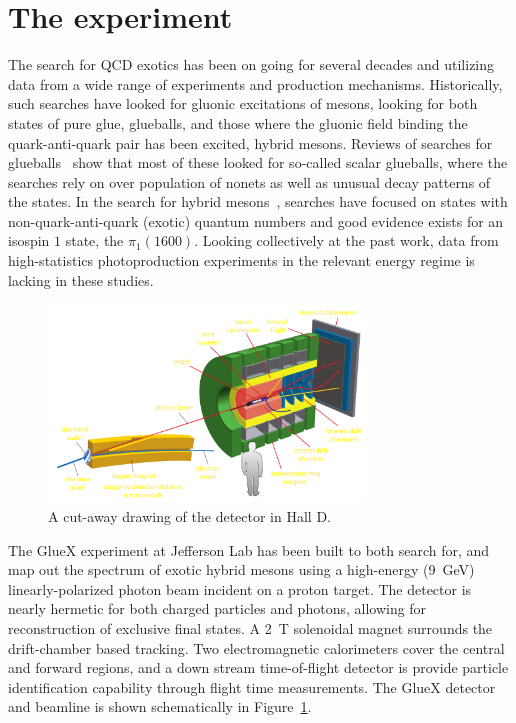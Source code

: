 \section[The \gx{} experiment]{\label{sec:gluexexperiment} The \gx{} experiment}
The search for QCD exotics has been on going for several decades and utilizing data from a wide range of experiments and production mechanisms. Historically, such searches have looked for gluonic excitations of mesons, looking for both states of pure glue, glueballs, and those where the gluonic field binding the quark-anti-quark pair has been excited, hybrid mesons. Reviews of searches for glueballs~\cite{Crede:2008vw} show that most of these looked for so-called scalar glueballs, where the searches rely on over population of nonets as well as unusual decay patterns of the states. In the search for hybrid mesons~\cite{Meyer:2010ku,Meyer:2015eta}, searches have focused on states with non-quark-anti-quark (exotic) quantum numbers and good evidence exists for an isospin $1$ state, the $\pi_{1}(1600)$. Looking collectively at the past work, data from high-statistics photoproduction experiments in the relevant energy regime is lacking in these studies. 

\begin{figure}[h!]\centering
\includegraphics[width=0.75\textwidth]{figures/detector_beamline_noplug_dark.pdf}
\caption[]{\label{fig:gluex_cut-away}A cut-away drawing of the \GX{} detector in Hall D.}
\end{figure}
The GlueX experiment at Jefferson Lab has been built to both search for, and map out the spectrum of exotic hybrid mesons using a high-energy (9~GeV) linearly-polarized photon beam incident on a proton target\cite{gluex-ref}. The detector is nearly hermetic for both charged particles and photons, allowing for reconstruction of exclusive final states. A 2~T solenoidal magnet surrounds the drift-chamber based tracking. Two electromagnetic calorimeters cover the central and forward regions, and a down stream time-of-flight detector is provide particle identification capability through flight time measurements. The GlueX detector and beamline is shown schematically in Figure~\ref{fig:gluex_cut-away}.


